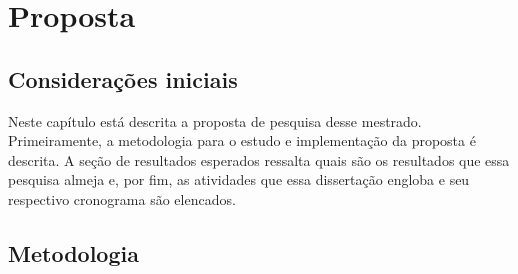 \chapter{Proposta}
\label{chap:proposta}
\section{Considerações iniciais}

Neste capítulo está descrita a proposta de pesquisa desse mestrado. Primeiramente, a metodologia para o estudo e implementação da proposta é descrita. A seção de resultados esperados ressalta quais são os resultados que essa pesquisa almeja e, por fim, as atividades que essa dissertação engloba e seu respectivo cronograma são elencados.

\section{Metodologia}

